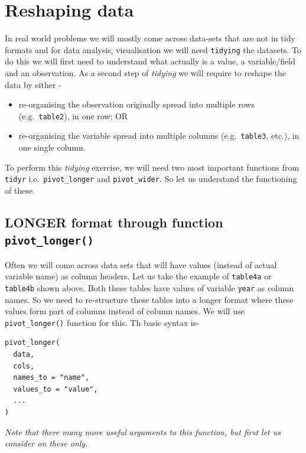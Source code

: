 \documentclass[
]{book}
\providecommand{\tightlist}{%
  \setlength{\itemsep}{0pt}\setlength{\parskip}{0pt}}
\begin{document}
\hypertarget{reshaping-data}{%
\section{Reshaping data}\label{reshaping-data}}

In real world problems we will mostly come across data-sets that are not in tidy formats and for data analysis, visualisation we will need \texttt{tidying} the datasets. To do this we will first need to understand what actually is a value, a variable/field and an observation. As a second step of \emph{tidying} we will require to reshape the data by either -

\begin{itemize}
\tightlist
\item
  re-organising the observation originally spread into multiple rows (e.g.~\texttt{table2}), in one row; OR
\item
  re-organising the variable spread into multiple columns (e.g.~\texttt{table3}, etc.), in one single column.
\end{itemize}

To perform this \emph{tidying} exercise, we will need two most important functions from \texttt{tidyr} i.e.~\texttt{pivot\_longer} and \texttt{pivot\_wider}. So let us understand the functioning of these.

\hypertarget{longer-format-through-function-pivot_longer}{%
\subsection{\texorpdfstring{LONGER format through function \texttt{pivot\_longer()}}{LONGER format through function pivot\_longer()}}\label{longer-format-through-function-pivot_longer}}

Often we will come across data sets that will have values (instead of actual variable name) as column headers. Let us take the example of \texttt{table4a} or \texttt{table4b} shown above. Both these tables have values of variable \texttt{year} as column names. So we need to re-structure these tables into a longer format where these values form part of columns instead of column names. We will use \texttt{pivot\_longer()} function for this. Th basic syntax is-

\begin{verbatim}
pivot_longer(
  data,
  cols,
  names_to = "name",
  values_to = "value",
  ...
)
\end{verbatim}

\emph{Note that there many more useful arguments to this function, but first let us consider on these only.}
\end{document}

